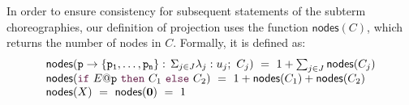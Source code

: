 %
In order to ensure consistency for subsequent statements of the
subterm choreographies, our definition of projection uses the function
\( \mathsf{nodes}(C) \), which returns the number of nodes in \( C
\). Formally, it is defined as:
    \begin{displaymath}
      \begin{array}{llll}
        \mathsf{nodes}(\interact{p}{\role p_1,\ldots,\role p_n})\ =\ 1+\sum_{j\in J}\mathsf{nodes}(C_j)\\
        \mathsf{nodes}(\ifTE {E}{p}{C_1}{C_2})\ =\ 1+\mathsf{nodes}(C_1)+\mathsf{nodes}(C_2)\\
        \mathsf{nodes}(X)\ =\ 
        \mathsf{nodes}(\CEnd)\ =\ 1
      \end{array}
    \end{displaymath}

